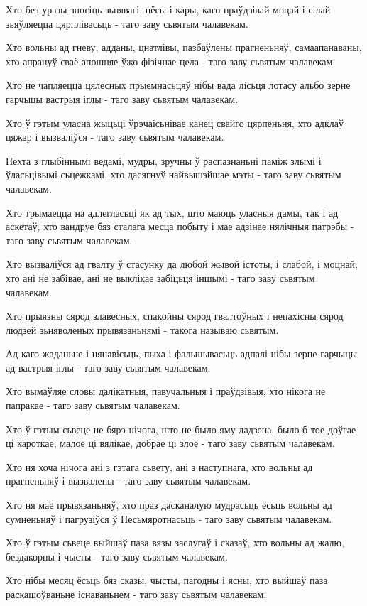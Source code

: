\documentclass{article}
\begin{document}
Хто без уразы зносіць зьнявагі, цёсы і кары, каго праўдзівай моцай
і сілай зьяўляецца цярплівасьць - таго заву сьвятым чалавекам.

Хто вольны ад гневу, адданы, цнатлівы, пазбаўлены прагненьняў,
самаапанаваны, хто апрануў сваё апошняе ўжо фізічнае цела - таго заву
сьвятым чалавекам.

Хто не чапляецца цялесных прыемнасьцяў нібы вада лісьця лотасу
альбо зерне гарчыцы вастрыя іглы - таго заву сьвятым чалавекам.

Хто ў гэтым уласна жыцьці ўрэчаісьнівае канец свайго цярпеньня, хто
адклаў цяжар і вызваліўся - таго заву сьвятым чалавекам.

Нехта з глыбіннымі ведамі, мудры, зручны ў распазнаньні паміж злымі
і ўласьцівымі сьцежкамі, хто дасягнуў найвышэйшае мэты - таго заву
сьвятым чалавекам.

Хто трымаецца на адлегласьці як ад тых, што маюць уласныя дамы, так
і ад аскетаў, хто вандруе бяз сталага месца побыту і мае адзінае
нялічныя патрэбы - таго заву сьвятым чалавекам.

Хто вызваліўся ад гвалту ў стасунку да любой жывой істоты, і
слабой, і моцнай, хто ані не забівае, ані не выклікае забіцьця іншымі -
таго заву сьвятым чалавекам.

Хто прыязны сярод злавесных, спакойны сярод гвалтоўных і непахісны
сярод людзей зьняволеных прывязаньнямі - такога называю сьвятым.

Ад каго жаданьне і нянавісьць, пыха і фальшывасьць адпалі нібы
зерне гарчыцы ад вастрыя іглы - таго заву сьвятым чалавекам.

Хто вымаўляе словы далікатныя, павучальныя і праўдзівыя, хто нікога
не папракае - таго заву сьвятым чалавекам.

Хто ў гэтым сьвеце не бярэ нічога, што не было яму дадзена, было б
тое доўгае ці кароткае, малое ці вялікае, добрае ці злое - таго заву
сьвятым чалавекам.

Хто ня хоча нічога ані з гэтага сьвету, ані з наступнага, хто
вольны ад прагненьняў і вызвалены - таго заву сьвятым чалавекам.

Хто ня мае прывязаньняў, хто праз дасканалую мудрасьць ёсьць вольны
ад сумненьняў і пагрузіўся ў Несьмяротнасьць - таго заву сьвятым
чалавекам.

Хто ў гэтым сьвеце выйшаў паза вязы заслугаў і сказаў, хто вольны
ад жалю, бездакорны і чысты - таго заву сьвятым чалавекам.

Хто нібы месяц ёсьць бяз сказы, чысты, пагодны і ясны, хто выйшаў
паза раскашоўваньне існаваньнем - таго заву сьвятым чалавекам.
\end{document}
